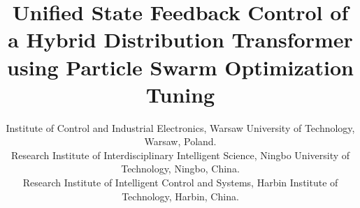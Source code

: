 \title{Unified State Feedback Control of a Hybrid Distribution Transformer using Particle Swarm Optimization Tuning\\
}

\author{
\and
{}
\and
{}
\linebreakand
{}
\and
{}
\linebreakand
{} Institute of Control and Industrial Electronics, Warsaw University of Technology, Warsaw, Poland.\\
 Research Institute of Interdisciplinary Intelligent Science, Ningbo University of Technology, Ningbo, China.\\
 Research Institute of Intelligent Control and Systems, Harbin Institute of Technology, Harbin, China.\\
}